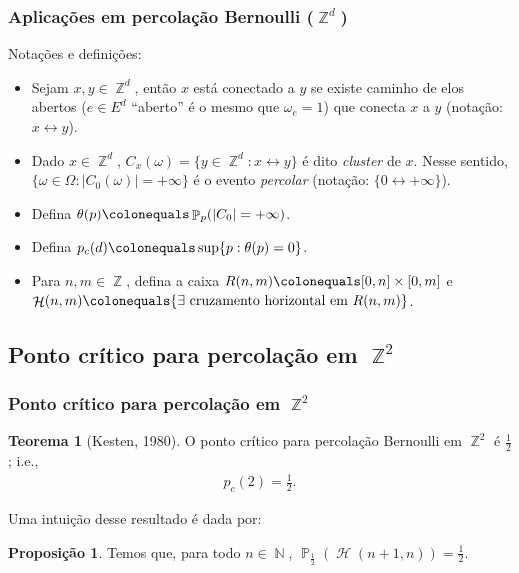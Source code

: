 \documentclass[12pt]{beamer}
\theoremstyle{definition} %
\newtheorem{mythm}{Teorema}
\newtheorem{mypro}{Proposição}
\DeclareMathOperator{\PX}{\mathbb{P}} %
\DeclareMathOperator{\NX}{\mathbb{N}} %
\DeclareMathOperator{\ZX}{\mathbb{Z}} %
\DeclareMathOperator{\HC}{\mathcal{H}} %
\begin{document}
	\begin{frame}[t]
		\frametitle{Aplicações em percolação Bernoulli ($\ZX^d$)}
		Notações e definições:
		\begin{itemize}
			\item Sejam $x, y \in \ZX^d$, então $x$ está conectado a $y$ se existe caminho de elos abertos ($e \in E^d$ ``aberto'' é o mesmo que $\omega_e = 1$) que conecta $x$ a $y$ (notação: $x \leftrightarrow y$).
			\pause
			\item Dado $x \in \ZX^d$, $C_x(\omega) = \{y \in \ZX^d : x \leftrightarrow y\}$ é dito \textit{cluster} de $x$. Nesse sentido, $\{\omega \in \Omega : |C_0(\omega)| = +\infty\}$ é o evento \textit{percolar} (notação: $\{0 \leftrightarrow +\infty\}$).
			\pause 
			\item Defina $\theta(p) \colonequals \PX_p(|C_0| = +\infty)$.
			\pause
			\item Defina $p_c(d) \colonequals \sup\{p:\theta(p) = 0\}$.
			\pause
			\item Para $n, m \in \ZX$, defina a caixa $R(n, m) \colonequals [0, n] \times [0, m]$ e $\HC(n, m) \colonequals \{\exists \text{ cruzamento horizontal em } R(n, m)\}$.
		\end{itemize}
	\end{frame}
	
	\subsection{Ponto crítico para percolação em $\ZX^2$}
	\begin{frame}[t]
		\frametitle{Ponto crítico para percolação em $\ZX^2$}
		\begin{mythm}[Kesten, 1980]
			O ponto crítico para percolação Bernoulli em $\ZX^2$ é $\frac{1}{2}$; i.e., 
			\begin{align*}
				p_c(2) = \frac{1}{2}.
			\end{align*}
			\label{thm-kesten}
		\end{mythm}
		\pause
		Uma intuição desse resultado é dada por:	
		\begin{minipage}{0.50 \textwidth}
			\begin{mypro}
				Temos que, para todo $n \in \NX$, $\PX_{\frac{1}{2}}(\HC(n + 1, n)) = \frac{1}{2}$.
				\label{prop-kesten}
			\end{mypro}
		\end{minipage}
		\begin{minipage}{0.475 \textwidth}
			
		\end{minipage}
	\end{frame}
\end{document}
